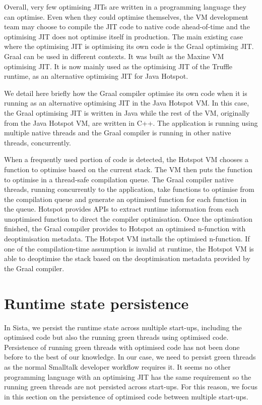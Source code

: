 \documentclass[a4paper,12pt,twoside]{../includes/ThesisStyle}
\begin{document}
Overall, very few optimising JITs are written in a programming language they can optimise. Even when they could optimise themselves, the VM development team may choose to compile the JIT code to native code ahead-of-time and the optimising JIT does not optimise itself in production. The main existing case where the optimising JIT is optimising its own code is the Graal optimising JIT. Graal can be used in different contexts. It was built as the Maxine VM optimising JIT. It is now mainly used as the optimising JIT of the Truffle runtime, as an alternative optimising JIT for Java Hotspot.

We detail here briefly how the Graal compiler optimise its own code when it is running as an alternative optimising JIT in the Java Hotspot VM. In this case, the Graal optimising JIT is written in Java while the rest of the VM, originally from the Java Hotspot VM, are written in C++. The application is running using multiple native threads and the Graal compiler is running in other native threads, concurrently.

When a frequently used portion of code is detected, the Hotspot VM chooses a function to optimise based on the current stack. The VM then puts the function to optimise in a thread-safe compilation queue. The Graal compiler native threads, running concurrently to the application, take functions to optimise from the compilation queue and generate an optimised function for each function in the queue. Hotspot provides APIs to extract runtime information from each unoptimised function to direct the compiler optimisation. Once the optimisation finished, the Graal compiler provides to Hotspot an optimised n-function with deoptimisation metadata. The Hotspot VM installs the optimised n-function. If one of the compilation-time assumption is invalid at runtime, the Hotspot VM is able to deoptimise the stack based on the deoptimisation metadata provided by the Graal compiler.


\section{Runtime state persistence}
\label{sec:persistence}

In Sista, we persist the runtime state across multiple start-ups, including the optimised code but also the running green threads using optimised code. Persistence of running green threads with optimised code has not been done before to the best of our knowledge. In our case, we need to persist green threads as the normal Smalltalk developer workflow requires it. It seems no other programming language with an optimising JIT has the same requirement so the running green threads are not persisted across start-ups. For this reason, we focus in this section on the persistence of optimised code between multiple start-ups.
\end{document}
